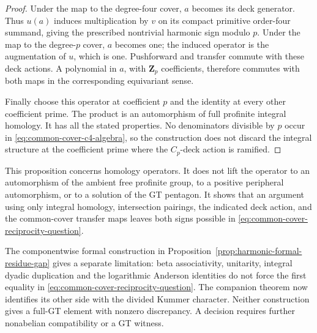 \begin{proof}
Under the map to the degree-four cover, \(a\) becomes its
deck generator. Thus \(u(a)\) induces multiplication by
\(v\) on its compact primitive order-four summand, giving
the prescribed nontrivial harmonic sign modulo \(p\).
Under the map to the degree-\(p\) cover, \(a\) becomes one;
the induced operator is the augmentation of \(u\), which
is one. Pushforward and transfer commute with these deck
actions. A polynomial in \(a\), with \(\mathbf Z_p\)
coefficients, therefore commutes with both maps in the
corresponding equivariant sense.

Finally choose this operator at coefficient \(p\) and the
identity at every other coefficient prime. The product is
an automorphism of full profinite integral homology. It
has all the stated properties. No denominators divisible
by \(p\) occur in \eqref{eq:common-cover-c4-algebra}, so the construction does not discard
the integral structure at the coefficient prime where the
\(C_p\)-deck action is ramified.
\end{proof}

This proposition concerns homology operators. It does not lift
the operator to an automorphism of the ambient free profinite
group, to a positive peripheral automorphism, or to a solution
of the GT pentagon. It shows that an argument using only
integral homology, intersection pairings, the indicated deck
action, and the common-cover transfer maps leaves both signs
possible in \eqref{eq:common-cover-reciprocity-question}.


The componentwise formal construction in
Proposition~\ref{prop:harmonic-formal-residue-gap} gives a separate
limitation: beta associativity, unitarity, integral dyadic duplication
and the logarithmic Anderson identities do not force the first equality
in \eqref{eq:common-cover-reciprocity-question}. The companion theorem
now identifies its other side with the divided Kummer character.
Neither construction gives a full-GT element with nonzero discrepancy.
A decision requires further nonabelian compatibility or a GT witness.
